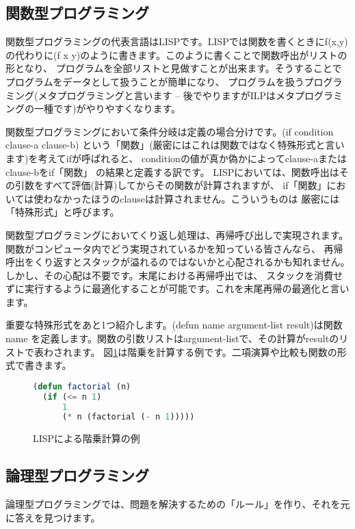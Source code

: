 \documentclass[a4j,dvipdfmx]{jsarticle}
\newcommand{\fixed}[1]{{\ttfamily #1}}
\begin{document}
\subsection{関数型プログラミング}
関数型プログラミングの代表言語はLISPです。LISPでは関数を書くときに{\fixed f(x,y)}
の代わりに{\fixed (f x y)}のように書きます。このように書くことで関数呼出がリストの形となり、
プログラムを全部リストと見做すことが出来ます。そうすることでプログラムをデータとして扱うことが簡単になり、
プログラムを扱うプログラミング(メタプログラミングと言います -- 
後でやりますがILPはメタプログラミングの一種です)がやりやすくなります。

関数型プログラミングにおいて条件分岐は定義の場合分けです。{\fixed (if condition clause-a clause-b)}
という「関数」(厳密にはこれは関数ではなく特殊形式と言います)を考えて{\fixed if}が呼ばれると、
{\fixed condition}の値が真か偽かによって{\fixed clause-a}または{\fixed clause-b}を{\fixed if}「関数」
の結果と定義する訳です。
LISPにおいては、関数呼出はその引数をすべて評価(計算)してからその関数が計算されますが、
{\fixed if}「関数」においては使わなかったほうの{\fixed clause}は計算されません。こういうものは
厳密には「特殊形式」と呼びます。

関数型プログラミングにおいてくり返し処理は、再帰呼び出しで実現されます。
関数がコンピュータ内でどう実現されているかを知っている皆さんなら、
再帰呼出をくり返すとスタックが溢れるのではないかと心配されるかも知れません。
しかし、その心配は不要です。末尾における再帰呼出では、
スタックを消費せずに実行するように最適化することが可能です。これを末尾再帰の最適化と言います。

重要な特殊形式をあと1つ紹介します。{\fixed (defun name argument-list result)}は関数{\fixed name}
を定義します。関数の引数リストは{\fixed argument-list}で、その計算が{\fixed result}のリストで表わされます。
図\ref{fig:factorial}は階乗を計算する例です。二項演算や比較も関数の形式で書きます。

\begin{figure}[htbp]
\centering
\begin{lstlisting}[language=Lisp]
(defun factorial (n)
  (if (<= n 1)
      1
      (* n (factorial (- n 1)))))
\end{lstlisting}
\caption{LISPによる階乗計算の例}
\label{fig:factorial}
\end{figure}

\subsection{論理型プログラミング}
論理型プログラミングでは、問題を解決するための「ルール」を作り、それを元に答えを見つけます。
\end{document}
